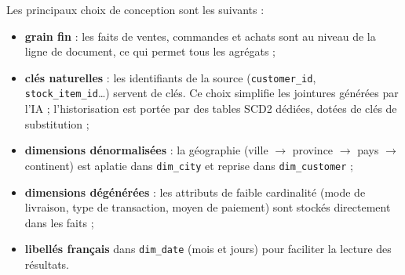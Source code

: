 Les principaux choix de conception sont les suivants :
\begin{itemize}
  \item \textbf{grain fin} : les faits de ventes, commandes et achats sont au niveau de la ligne de
        document, ce qui permet tous les agrégats ;
  \item \textbf{clés naturelles} : les identifiants de la source (\texttt{customer\_id},
        \texttt{stock\_item\_id}\ldots) servent de clés. Ce choix simplifie les jointures générées par
        l'IA ; l'historisation est portée par des tables SCD2 dédiées, dotées de clés de substitution ;
  \item \textbf{dimensions dénormalisées} : la géographie (ville $\rightarrow$ province $\rightarrow$
        pays $\rightarrow$ continent) est aplatie dans \texttt{dim\_city} et reprise dans
        \texttt{dim\_customer} ;
  \item \textbf{dimensions dégénérées} : les attributs de faible cardinalité (mode de livraison, type de
        transaction, moyen de paiement) sont stockés directement dans les faits ;
  \item \textbf{libellés français} dans \texttt{dim\_date} (mois et jours) pour faciliter la lecture des
        résultats.
\end{itemize}
